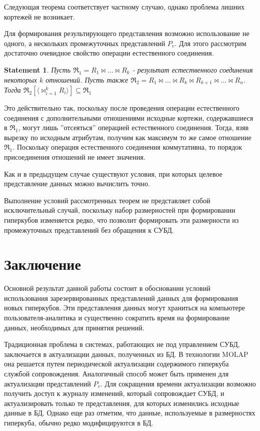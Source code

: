 \documentclass[10pt,a4paper]{article}
\newtheorem{statement}{Statement}
\begin{document}
Следующая теорема соответствует частному случаю, однако проблема лишних кортежей не возникает.



Для формирования результирующего представления возможно использование
не одного, а нескольких промежуточных представлений $P_v$. Для этого
рассмотрим достаточно очевидное свойство операции естественного соединения.

\begin{statement}
Пусть $\Re_1 = R_1 \Join \dots \Join R_k$ - результат естественного
соединения некоторых $k$ отношений. Пусть также $\Re_2 = R_1 \Join \dots
\Join R_k \Join R_{k+1} \Join \dots \Join R_{n}$. 
Тогда $\Re_2 [\langle \Join_{i=1}^{k} R_i \rangle] \subseteq \Re_1$
\label{join_property}
\end{statement}

Это действительно так, поскольку после проведения операции естественного соединения
с дополнительными отношениями исходные кортежи, содержавшиеся в $\Re_1$, могут
лишь ''отсеяться'' операцией естественного соединения. Тогда, взяв вырезку по
исходным атрибутам, получим как максимум то же самое отношение $\Re_1$. Поскольку
операция естественного соединения коммутативна, то порядок присоединения отношений
не имеет значения.



Как и в предыдущем случае существуют условия, при которых целевое представление
данных можно вычислить точно.



Выполнение условий рассмотренных теорем не представляет собой  исключительный случай,
поскольку набор размерностей при формировании гиперкубов изменяется редко, что позволит
формировать эти размерности из промежуточных представлений без обращения к СУБД.

\section{Заключение}

Основной результат данной работы состоит в обосновании условий использования
зарезервированных представлений данных для формирования новых гиперкубов.
Эти представления данных могут храниться на компьютере пользователя-аналитика
и существенно сократить время на формирование данных, необходимых для принятия решений.

Традиционная проблема в системах, работающих не под управлением СУБД, заключается
в актуализации данных, полученных из БД. В технологии MOLAP она решается путем периодической
актуализации содержимого гиперкуба службой сопровождения. Аналогичный способ может быть
применен для актуализации представлений $P_v$. Для сокращения времени актуализации возможно
получить доступ к журналу изменений, который сопровождает СУБД, и актуализировать только те
представления, для которых изменились исходные данные в БД. Однако еще раз отметим, что данные,
используемые в размерностях гиперкуба, обычно редко модифицируются в БД.
\end{document}
